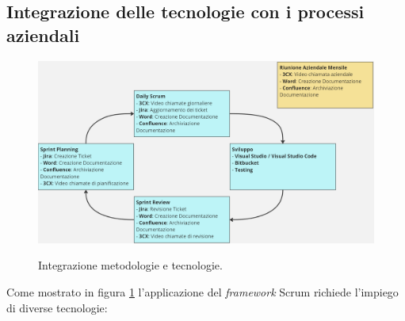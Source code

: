 \subsection{Integrazione delle tecnologie con i processi aziendali}
\begin{figure}[H]
      \centering
      \includegraphics[alt={metodologie e tecnologie}, width=\textwidth]{img/integrazione metodologie strumenti.png}
      \caption[Integrazione metodologie e tecnologie]
              {Integrazione metodologie e tecnologie.}
      \label{fig:integrazione tecnologie e metodologie}
  \end{figure}
Come mostrato in figura \ref{fig:integrazione tecnologie e metodologie} l'applicazione del \textit{framework} Scrum richiede 
l'impiego di diverse tecnologie:
